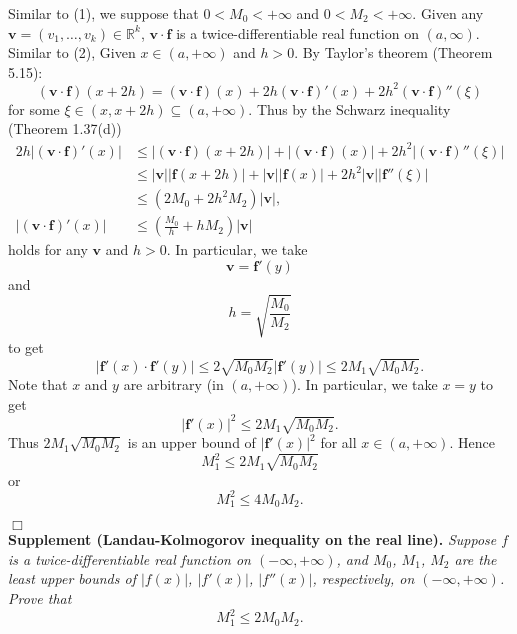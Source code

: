\documentclass{article}
\begin{document}
\begin{enumerate}
Similar to (1), we suppose that $0 < M_0 < +\infty$ and $0 < M_2 < +\infty$.
Given any $\mathbf{v} = (v_1, \ldots, v_k) \in \mathbb{R}^k$,
$\mathbf{v} \cdot \mathbf{f}$ is a twice-differentiable real function on $(a,\infty)$.
Similar to (2),
Given $x \in (a,+\infty)$ and $h>0$.
By Taylor's theorem (Theorem 5.15):
\[
  (\mathbf{v} \cdot \mathbf{f})(x+2h)
  = (\mathbf{v} \cdot \mathbf{f})(x)
    + 2h (\mathbf{v} \cdot \mathbf{f})'(x)
    + 2 h^2 (\mathbf{v} \cdot \mathbf{f})''(\xi)
\]
for some $\xi \in (x,x+2h) \subseteq (a,+\infty)$.
Thus by the Schwarz inequality (Theorem 1.37(d))
\begin{align*}
  2h|(\mathbf{v} \cdot \mathbf{f})'(x)|
  &\leq |(\mathbf{v} \cdot \mathbf{f})(x+2h)|
    + |(\mathbf{v} \cdot \mathbf{f})(x)|
    + 2 h^2 |(\mathbf{v} \cdot \mathbf{f})''(\xi)| \\
  &\leq |\mathbf{v}| |\mathbf{f}(x+2h)|
    + |\mathbf{v}||\mathbf{f}(x)|
    + 2 h^2 |\mathbf{v}| |\mathbf{f}''(\xi)| \\
  &\leq (2 M_0 + 2 h^2 M_2)|\mathbf{v}|, \\
  |(\mathbf{v} \cdot \mathbf{f})'(x)|
  &\leq \left(\frac{M_0}{h} + h M_2\right)|\mathbf{v}|
\end{align*}
holds for any $\mathbf{v}$ and $h > 0$.
In particular, we take
\[
  \mathbf{v} = \mathbf{f}'(y)
\]
and
\[
  h = \sqrt{\frac{M_0}{M_2}}
\]
to get
\[
  |\mathbf{f}'(x) \cdot \mathbf{f}'(y)|
  \leq 2 \sqrt{M_0 M_2} |\mathbf{f}'(y)|
  \leq 2 M_1 \sqrt{M_0 M_2}.
\]
Note that $x$ and $y$ are arbitrary (in $(a,+\infty)$).
In particular, we take $x = y$ to get
\[
  |\mathbf{f}'(x)|^2 \leq 2 M_1 \sqrt{M_0 M_2}.
\]
Thus $2 M_1 \sqrt{M_0 M_2}$ is an upper bound of $|\mathbf{f}'(x)|^2$ for all $x \in (a,+\infty)$.
Hence
\[
  M_1^2 \leq 2 M_1 \sqrt{M_0 M_2}
\]
or
\[
  M_1^2 \leq 4 M_0 M_2.
\]
\end{enumerate}
$\Box$ \\

\textbf{Supplement (Landau-Kolmogorov inequality on the real line).}
\emph{Suppose $f$ is a twice-differentiable real function on $(-\infty,+\infty)$,
and $M_0$, $M_1$, $M_2$ are the least upper bounds of
$|f(x)|$, $|f'(x)|$, $|f''(x)|$, respectively, on $(-\infty,+\infty)$.
Prove that
\[
  M_1^2 \leq 2 M_0 M_2.
\]}
\end{document}
